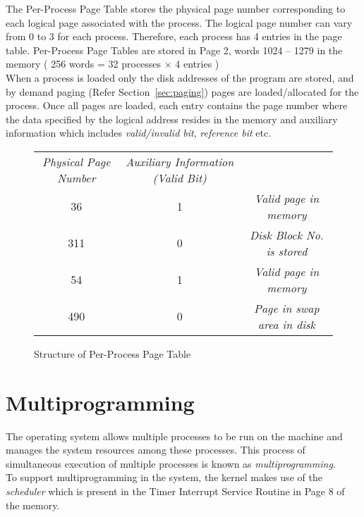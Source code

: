 \documentclass[10pt]{report}
\begin{document}
The Per-Process Page Table stores the physical page number corresponding to each logical page associated with the process. The logical page number can vary from 0 to 3 for each process.  Therefore, each process has 4 entries in the page table. Per-Process Page Tables are stored in Page 2, words 1024 -- 1279 in the memory ( 256 words = 32 processes $\times$ 4 entries )\\

When a process is loaded only the disk addresses of the program are stored, and by demand paging (Refer Section~\ref{sec:paging}) pages are loaded/allocated for the process.	 Once all pages are loaded, each entry contains the page number where the data specified by the logical address resides in the memory and auxiliary information which includes \textit{valid/invalid bit}, \textit{reference bit} etc.

		\begin{figure}[htp!]
		\centering
		\begin{tabular}{|c|c|c}
			\textit{Physical Page Number} & \textit{Auxiliary Information (Valid Bit)} \\
			\cline{0-1}
			36 & 1  & \footnotesize \textit{ {Valid page in memory}}\\
			\cline{0-1}
			311 & 0 & \footnotesize \textit{ {Disk Block No. is stored }}\\
			\cline{0-1}
			54 &  1 & \footnotesize \textit{ {Valid page in memory}}\\
			\cline{0-1}
			490 & 0 & \footnotesize \textit{ {Page in swap area in disk}}\\
			\cline{0-1}
		\end{tabular}
		\caption{Structure of Per-Process Page Table}
		\label{fig:processfile table}
	\end{figure}
	
\section{Multiprogramming}
\label{sec:multiprogramming}
	
The operating system allows multiple processes to be run on the machine and manages the system resources among these processes. This process of simultaneous execution of multiple processes is known as \emph{multiprogramming}.  \\

To support multiprogramming in the system, the kernel makes use of the \emph{scheduler} which is present in the Timer Interrupt Service Routine in Page 8 of the memory.
\end{document}
